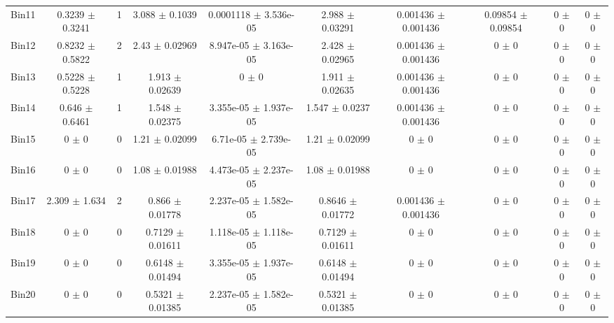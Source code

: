 \begin{tabular}{@{\extracolsep{4pt}}lccccccccc@{}}
     Bin11 & 0.3239 $\pm$ 0.3241 & 1 & 3.088 $\pm$ 0.1039 & 0.0001118 $\pm$ 3.536e-05 & 2.988 $\pm$ 0.03291 & 0.001436 $\pm$ 0.001436 & 0.09854 $\pm$ 0.09854 & 0 $\pm$ 0 & 0 $\pm$ 0 \\ 
     Bin12 & 0.8232 $\pm$ 0.5822 & 2 & 2.43 $\pm$ 0.02969 & 8.947e-05 $\pm$ 3.163e-05 & 2.428 $\pm$ 0.02965 & 0.001436 $\pm$ 0.001436 & 0 $\pm$ 0 & 0 $\pm$ 0 & 0 $\pm$ 0 \\ 
     Bin13 & 0.5228 $\pm$ 0.5228 & 1 & 1.913 $\pm$ 0.02639 & 0 $\pm$ 0 & 1.911 $\pm$ 0.02635 & 0.001436 $\pm$ 0.001436 & 0 $\pm$ 0 & 0 $\pm$ 0 & 0 $\pm$ 0 \\ 
     Bin14 & 0.646 $\pm$ 0.6461 & 1 & 1.548 $\pm$ 0.02375 & 3.355e-05 $\pm$ 1.937e-05 & 1.547 $\pm$ 0.0237 & 0.001436 $\pm$ 0.001436 & 0 $\pm$ 0 & 0 $\pm$ 0 & 0 $\pm$ 0 \\ 
     Bin15 & 0 $\pm$ 0 & 0 & 1.21 $\pm$ 0.02099 & 6.71e-05 $\pm$ 2.739e-05 & 1.21 $\pm$ 0.02099 & 0 $\pm$ 0 & 0 $\pm$ 0 & 0 $\pm$ 0 & 0 $\pm$ 0 \\ 
     Bin16 & 0 $\pm$ 0 & 0 & 1.08 $\pm$ 0.01988 & 4.473e-05 $\pm$ 2.237e-05 & 1.08 $\pm$ 0.01988 & 0 $\pm$ 0 & 0 $\pm$ 0 & 0 $\pm$ 0 & 0 $\pm$ 0 \\ 
     Bin17 & 2.309 $\pm$ 1.634 & 2 & 0.866 $\pm$ 0.01778 & 2.237e-05 $\pm$ 1.582e-05 & 0.8646 $\pm$ 0.01772 & 0.001436 $\pm$ 0.001436 & 0 $\pm$ 0 & 0 $\pm$ 0 & 0 $\pm$ 0 \\ 
     Bin18 & 0 $\pm$ 0 & 0 & 0.7129 $\pm$ 0.01611 & 1.118e-05 $\pm$ 1.118e-05 & 0.7129 $\pm$ 0.01611 & 0 $\pm$ 0 & 0 $\pm$ 0 & 0 $\pm$ 0 & 0 $\pm$ 0 \\ 
     Bin19 & 0 $\pm$ 0 & 0 & 0.6148 $\pm$ 0.01494 & 3.355e-05 $\pm$ 1.937e-05 & 0.6148 $\pm$ 0.01494 & 0 $\pm$ 0 & 0 $\pm$ 0 & 0 $\pm$ 0 & 0 $\pm$ 0 \\ 
     Bin20 & 0 $\pm$ 0 & 0 & 0.5321 $\pm$ 0.01385 & 2.237e-05 $\pm$ 1.582e-05 & 0.5321 $\pm$ 0.01385 & 0 $\pm$ 0 & 0 $\pm$ 0 & 0 $\pm$ 0 & 0 $\pm$ 0 \\ 
\hline\hline
  \end{tabular}
